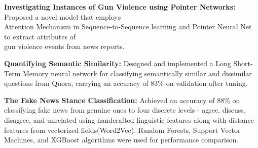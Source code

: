 \vspace{-4mm}
\begin{cventries}
\vspace{-3.5mm}
  \cventry
    {}
    {}
    {}
    {}
    {
      \begin{cvitems}
      \item {{ \textbf{Investigating Instances of Gun Violence using Pointer Networks:} Proposed a novel model that employs \\ Attention Mechanism in Sequence-to-Sequence learning and Pointer Neural Net to extract attributes of \\ gun violence events from news reports.}}
      \item {{ \textbf{Quantifying Semantic Similarity:} Designed and implemented a Long Short-Term Memory neural network for classifying semantically similar and dissimilar questions from Quora, carrying an accuracy of 83\% on validation after tuning.}}
      \item { \textbf{The Fake News Stance Classification:} Achieved an accuracy of 88\% on classifying fake news from genuine ones to four discrete levels - agree, discuss, disagree, and unrelated using handcrafted linguistic features along with distance features from vectorized fields(Word2Vec). Random Forests, Support Vector Machines, and XGBoost algorithms were used for performance comparison.}
      \end{cvitems}
    }
\end{cventries}
